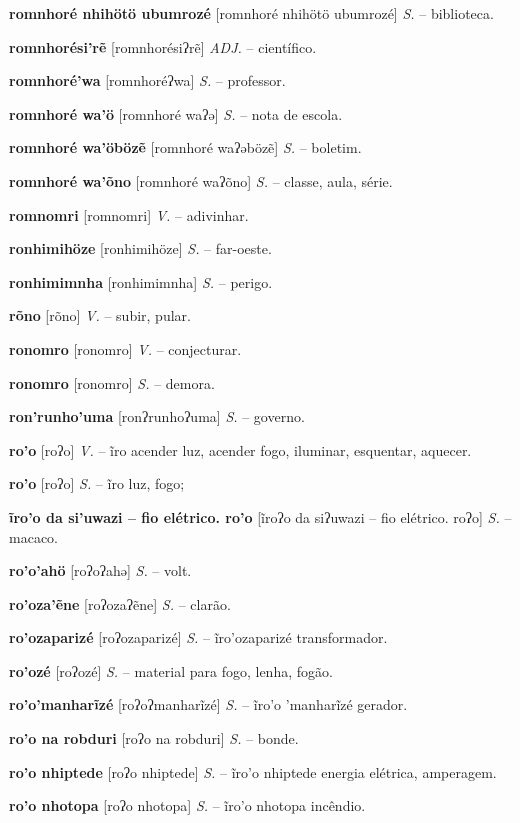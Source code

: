 \textbf{romnhoré nhihötö ubumrozé} [romnhoré nhihötö ubumrozé] \textit{S.} -- biblioteca.

\textbf{romnhorési'rẽ} [romnhorésiʔrẽ] \textit{ADJ.} -- científico.

\textbf{romnhoré'wa} [romnhoréʔwa] \textit{S.} -- professor.

\textbf{romnhoré wa'ö} [romnhoré waʔə] \textit{S.} -- nota de escola.

\textbf{romnhoré wa'öbözẽ} [romnhoré waʔəbözẽ] \textit{S.} -- boletim.

\textbf{romnhoré wa'õno} [romnhoré waʔõno] \textit{S.} -- classe, aula, série.

\textbf{romnomri} [romnomri] \textit{V.} -- adivinhar.

\textbf{ronhimihöze} [ronhimihöze] \textit{S.} -- far-oeste.

\textbf{ronhimimnha} [ronhimimnha] \textit{S.} -- perigo.

\textbf{rõno} [rõno] \textit{V.} -- subir, pular.

\textbf{ronomro} [ronomro] \textit{V.} -- conjecturar.

\textbf{ronomro} [ronomro] \textit{S.} -- demora.

\textbf{ron'runho'uma} [ronʔrunhoʔuma] \textit{S.} -- governo.

\textbf{ro'o} [roʔo] \textit{V.} -- ĩro acender luz, acender fogo, iluminar, esquentar, aquecer.

\textbf{ro'o} [roʔo] \textit{S.} -- ĩro luz, fogo;

\textbf{ĩro'o da si'uwazi -- fio elétrico. ro'o} [ĩroʔo da siʔuwazi -- fio elétrico. roʔo] \textit{S.} -- macaco.

\textbf{ro'o'ahö} [roʔoʔahə] \textit{S.} -- volt.

\textbf{ro'oza'ẽne} [roʔozaʔẽne] \textit{S.} -- clarão.

\textbf{ro'ozaparizé} [roʔozaparizé] \textit{S.} -- ĩro'ozaparizé transformador.

\textbf{ro'ozé} [roʔozé] \textit{S.} -- material para fogo, lenha, fogão.

\textbf{ro'o'manharĩzé} [roʔoʔmanharĩzé] \textit{S.} -- ĩro'o 'manharĩzé gerador.

\textbf{ro'o na robduri} [roʔo na robduri] \textit{S.} -- bonde.

\textbf{ro'o nhiptede} [roʔo nhiptede] \textit{S.} -- ĩro'o nhiptede energia elétrica, amperagem.

\textbf{ro'o nhotopa} [roʔo nhotopa] \textit{S.} -- ĩro'o nhotopa incêndio.

